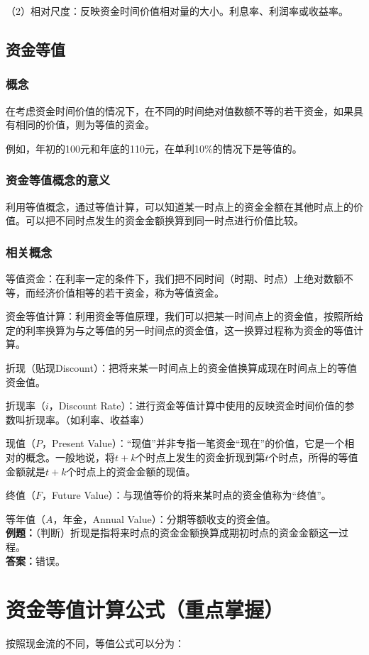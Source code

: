 \documentclass[12pt, a4paper, oneside]{ctexbook}
\begin{document}
（2）相对尺度：反映资金时间价值相对量的大小。利息率、利润率或收益率。

\subsection{资金等值}
\subsubsection{概念}
在考虑资金时间价值的情况下，在不同的时间绝对值数额不等的若干资金，如果具有相同的价值，则为等值的资金。

例如，年初的100元和年底的110元，在单利10\%的情况下是等值的。

\subsubsection{资金等值概念的意义}
利用等值概念，通过等值计算，可以知道某一时点上的资金金额在其他时点上的价值。可以把不同时点发生的资金金额换算到同一时点进行价值比较。
\subsubsection{相关概念}
等值资金：在利率一定的条件下，我们把不同时间（时期、时点）上绝对数额不等，而经济价值相等的若干资金，称为等值资金。

资金等值计算：利用资金等值原理，我们可以把某一时间点上的资金值，按照所给定的利率换算为与之等值的另一时间点的资金值，这一换算过程称为资金的等值计算。

折现（贴现Discount）：把将来某一时间点上的资金值换算成现在时间点上的等值资金值。

折现率（$i$，Discount Rate）：进行资金等值计算中使用的反映资金时间价值的参数叫折现率。（如利率、收益率）

现值（$P$，Present Value）：“现值”并非专指一笔资金“现在”的价值，它是一个相对的概念。一般地说，将$t+k$个时点上发生的资金折现到第$t$个时点，所得的等值金额就是$t+k$个时点上的资金金额的现值。

终值（$F$，Future Value）：与现值等价的将来某时点的资金值称为“终值”。

等年值（$A$，年金，Annual Value）：分期等额收支的资金值。\\
\textbf{例题：}（判断）折现是指将来时点的资金金额换算成期初时点的资金金额这一过程。\\
\textbf{答案：}错误。

\section{资金等值计算公式（重点掌握）}
按照现金流的不同，等值公式可以分为：
\end{document}
